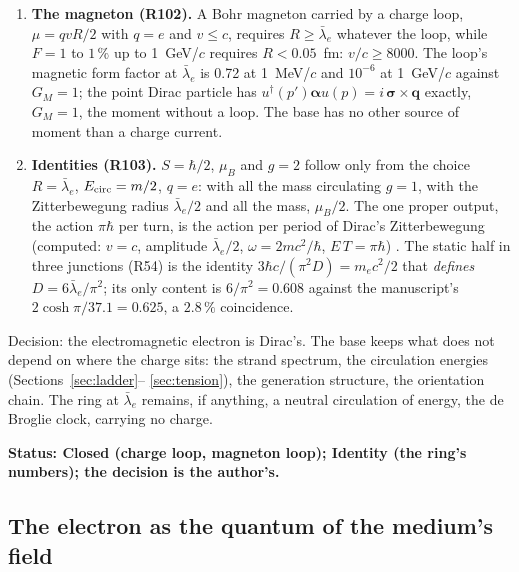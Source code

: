 \documentclass[11pt,a4paper]{article}
\theoremstyle{plain}
\theoremstyle{remark}
\newcommand{\lb}{\ensuremath{\bar\lambda_e}}
\newcommand{\status}[1]{\medskip\noindent\textbf{Status: #1.}\ }
\begin{document}
\begin{enumerate}[nosep]
\cite{foldy}, a kinematic quantity. The earlier prediction of the redraw (R89) that the ring should
have $r_{\rm rms} = (\sqrt3/2)\lb = 334$~fm to reproduce the Darwin term is withdrawn: the target
was never a charge radius.
\item \textbf{The magneton (R102).} A Bohr magneton carried by a charge loop, $\mu = qvR/2$ with
$q = e$ and $v \le c$, requires $R \ge \lb$ whatever the loop, while $F = 1$ to $1\,\%$ up to
1~GeV/$c$ requires $R < 0.05$~fm: $v/c \ge 8000$. The loop's magnetic form factor at $\lb$ is
0.72 at 1~MeV/$c$ and $10^{-6}$ at 1~GeV/$c$ against $G_M = 1$; the point Dirac particle has
$u^\dagger(p')\boldsymbol\alpha u(p) = i\,\boldsymbol\sigma\times\mathbf q$ exactly, $G_M = 1$, the
moment without a loop. The base has no other source of moment than a charge current.
\item \textbf{Identities (R103).} $S = \hbar/2$, $\mu_B$ and $g = 2$ follow only from the choice
$R = \lb$, $E_{\rm circ} = m/2$, $q = e$: with all the mass circulating $g = 1$, with the
Zitterbewegung radius $\lb/2$ and all the mass, $\mu_B/2$. The one proper output, the action
$\pi\hbar$ per turn, is the action per period of Dirac's Zitterbewegung (computed: $v = c$,
amplitude $\lb/2$, $\omega = 2mc^2/\hbar$, $E\,T = \pi\hbar$) \cite{schrodinger,hestenes}. The
static half in three junctions (R54) is the identity $3\hbar c/(\pi^2 D) = m_e c^2/2$ that
\emph{defines} $D = 6\lb/\pi^2$; its only content is $6/\pi^2 = 0.608$ against the manuscript's
$2\cosh\pi/37.1 = 0.625$, a $2.8\,\%$ coincidence.
\end{enumerate}

Decision: the electromagnetic electron is Dirac's. The base keeps what does not depend on where the
charge sits: the strand spectrum, the circulation energies (Sections~\ref{sec:ladder}--%
\ref{sec:tension}), the generation structure, the orientation chain. The ring at $\lb$ remains,
if anything, a neutral circulation of energy, the de Broglie clock, carrying no charge.

\status{Closed (charge loop, magneton loop); Identity (the ring's numbers); the decision is the
author's}

\subsection{The electron as the quantum of the medium's field}\label{sec:fieldquantum}
\end{document}
